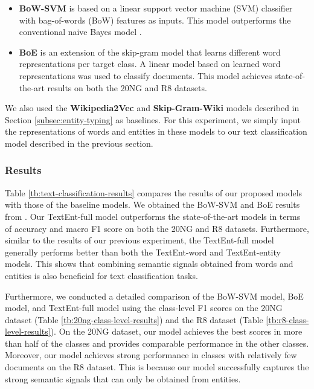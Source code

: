 \documentclass[11pt]{article}
\begin{document}
  \begin{itemize}
    \item \textbf{BoW-SVM} is based on a linear support vector machine (SVM) classifier with bag-of-words (BoW) features as inputs.
    This model outperforms the conventional naive Bayes model \cite{Jin2016}.
    \item \textbf{BoE} \cite{Jin2016} is an extension of the skip-gram model that learns different word representations per target class.
    A linear model based on learned word representations was used to classify documents.
    This model achieves state-of-the-art results on both the 20NG and R8 datasets.
  \end{itemize}
  We also used the \textbf{Wikipedia2Vec} and \textbf{Skip-Gram-Wiki} models described in Section \ref{subsec:entity-typing} as baselines.
  For this experiment, we simply input the representations of words and entities in these models to our text classification model described in the previous section.

  \subsubsection*{Results}

  Table \ref{tb:text-classification-results} compares the results of our proposed models with those of the baseline models.
  We obtained the BoW-SVM and BoE results from .
  Our TextEnt-full model outperforms the state-of-the-art models in terms of accuracy and macro F1 score on both the 20NG and R8 datasets.
  Furthermore, similar to the results of our previous experiment, the TextEnt-full model generally performs better than both the TextEnt-word and TextEnt-entity models.
  This shows that combining semantic signals obtained from words and entities is also beneficial for text classification tasks.

  Furthermore, we conducted a detailed comparison of the BoW-SVM model, BoE model, and TextEnt-full model using the class-level F1 scores on the 20NG dataset (Table \ref{tb:20ng-class-level-results}) and the R8 dataset (Table \ref{tb:r8-class-level-results}).
  On the 20NG dataset, our model achieves the best scores in more than half of the classes and provides comparable performance in the other classes.
  Moreover, our model achieves strong performance in classes with relatively few documents on the R8 dataset.
  This is because our model successfully captures the strong semantic signals that can only be obtained from entities.
\end{document}
